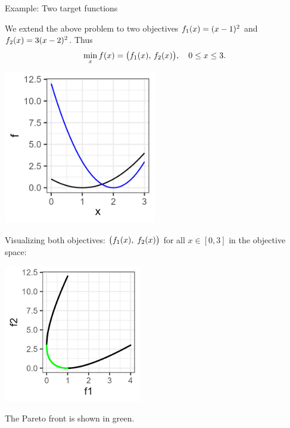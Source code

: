 \documentclass[11pt,compress,t,notes=noshow,xcolor=table]{beamer}
\begin{document}
\begin{vbframe}{Example: Two target functions}

We extend the above problem to two objectives 
\(f_1(x) = (x - 1)^2\) 
and 
\(f_2(x) = 3(x - 2)^2\). Thus
\[
  \min_{x} f(x) 
    = \bigl(f_1(x),\, f_2(x)\bigr),
  \quad 0 \le x \le 3.
\]

\begin{center}
\includegraphics[width=0.5\textwidth]{figure_man/graph2.png}
\end{center}

\framebreak

Visualizing both objectives:
$\bigl(f_1(x), \;f_2(x)\bigr)
$
for all \(x \in [0,3]\) in the objective space:

\begin{center}
\includegraphics[width=0.45\textwidth]{figure_man/graph3.png}
\end{center}

The Pareto front is shown in green. 

\end{vbframe}
\end{document}
